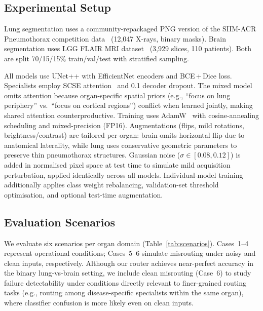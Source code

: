 \documentclass[a4paper,conference]{IEEEtran}
\begin{document}
\subsection{Experimental Setup}

Lung segmentation uses a community-repackaged PNG version of the SIIM-ACR Pneumothorax competition data~\cite{b12,b13} (12,047 X-rays, binary masks). Brain segmentation uses LGG FLAIR MRI dataset~\cite{b14} (3,929 slices, 110 patients). Both are split 70/15/15\% train/val/test with stratified sampling.

All models use UNet++ with EfficientNet encoders and BCE\,+\,Dice loss. Specialists employ SCSE attention~\cite{b15} and 0.1 decoder dropout. The mixed model omits attention because organ-specific spatial priors (e.g., ``focus on lung periphery'' vs.\ ``focus on cortical regions'') conflict when learned jointly, making shared attention counterproductive. Training uses AdamW~\cite{b16} with cosine-annealing scheduling and mixed-precision (FP16). Augmentations (flips, mild rotations, brightness/contrast) are tailored per-organ: brain omits horizontal flip due to anatomical laterality, while lung uses conservative geometric parameters to preserve thin pneumothorax structures. Gaussian noise ($\sigma \in [0.08, 0.12]$) is added in normalised pixel space at test time to simulate mild acquisition perturbation, applied identically across all models. Individual-model training additionally applies class weight rebalancing, validation-set threshold optimisation, and optional test-time augmentation.

\subsection{Evaluation Scenarios}

We evaluate six scenarios per organ domain (Table~\ref{tab:scenarios}). Cases~1--4 represent operational conditions; Cases~5--6 simulate misrouting under noisy and clean inputs, respectively. Although our router achieves near-perfect accuracy in the binary lung-vs-brain setting, we include clean misrouting (Case~6) to study failure detectability under conditions directly relevant to finer-grained routing tasks (e.g., routing among disease-specific specialists within the same organ), where classifier confusion is more likely even on clean inputs.
\end{document}
